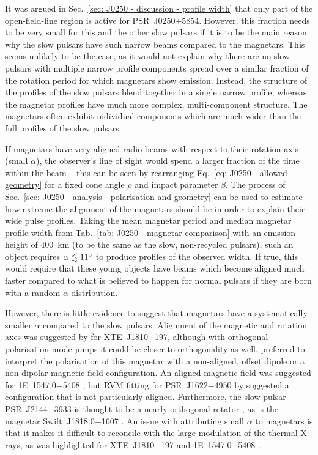 It was argued in Sec.~\ref{sec: J0250 - discussion - profile width} that only part of the open-field-line region is active for PSR~J0250+5854. However, this fraction needs to be very small for this and the other slow pulsars if it is to be the main reason why the slow pulsars have such narrow beams compared to the magnetars. This seems unlikely to be the case, as it would not explain why there are no slow pulsars with multiple narrow profile components spread over a similar fraction of the rotation period for which magnetars show emission. Instead, the structure of the profiles of the slow pulsars blend together in a single narrow profile, whereas the magnetar profiles have much more complex, multi-component structure. The magnetars often exhibit individual components which are much wider than the full profiles of the slow pulsars.





If magnetars have very aligned radio beams with respect to their rotation axis (small $\alpha$), the observer's line of sight would spend a larger fraction of the time within the beam -- this can be seen by rearranging Eq.~\eqref{eq: J0250 - allowed geometry} for a fixed cone angle $\rho$ and impact parameter $\beta$. The process of Sec.~\ref{sec: J0250 - analysis - polarisation and geometry} can be used to estimate how extreme the alignment of the magnetars should be in order to explain their wide pulse profiles. Taking the mean magnetar period and median magnetar profile width from Tab.~\ref{tab: J0250 - magnetar comparison} with an emission height of 400~km (to be the same as the slow, non-recycled pulsars), such an object requires $\alpha\lesssim 11^\circ$ to produce profiles of the observed width. If true, this would require that these young objects have beams which become aligned much faster compared to what is believed to happen for normal pulsars \citep{TMxx1998,WJxx2008} if they are born with a random $\alpha$ distribution.


However, there is little evidence to suggest that magnetars have a systematically smaller $\alpha$ compared to the slow pulsars. Alignment of the magnetic and rotation axes was suggested by \citet{CCR+2007} for XTE~J1810$-$197, although with orthogonal polarisation mode jumps it could be closer to orthogonality as well. \citet{KSJ+2007} preferred to interpret the polarisation of this magnetar with a non-aligned, offset dipole or a non-dipolar magnetic field configuration. An aligned magnetic field was suggested for 1E~1547.0$-$5408 \citep{CRJ+2008}, but RVM fitting for PSR~J1622$-$4950 by \citet{LBB+2012} suggested a configuration that is not particularly aligned. Furthermore, the slow pulsar PSR~J2144$-$3933 is thought to be a nearly orthogonal rotator \citep{MBMA2020}, as is the magnetar Swift~J1818.0$-$1607 \citep{LJS+2021}. An issue with attributing small $\alpha$ to magnetars is that it makes it difficult to reconcile with the large modulation of the thermal X-rays, as was highlighted for XTE~J1810$-$197 \citep{GHxx2007,PGxx2008} and 1E~1547.0$-$5408 \citep{IER+2010}.

